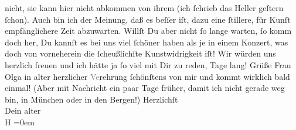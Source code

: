 \begin{ledgroupsized}[t]{13cm}
               nicht, sie kann hier nicht abkommen von ihrem \label{K_L02204_1v}\label{K_L02204_1h} (ich ſchrieb das Heller geſtern ſchon). Auch bin ich der Meinung, daß es beſſer iſt, dazu
               eine ſtillere, für Kunſt empfänglichere Zeit abzuwarten. Willſt Du aber nicht ſo
               lange warten, ſo komm doch her, Du kannſt es bei uns viel ſchöner haben als je in
               einem Konzert, was doch von vorneherein die ſcheußlichſte Kunstwidrigkeit iſt! Wir
               würden uns herzlich freuen und ich hätte ja ſo viel mit Dir zu reden, Tage lang!\pend
           \pstart
           Grüße Frau Olga in alter herzlicher
                  \textcolor{gray}{Ve}rehrung ſchönſtens von mir und kommt wirklich bald einmal!
               (Aber mit Nachricht ein paar Tage früher, damit ich nicht gerade weg bin, in München oder in den Bergen!)\pend
           \pstart
           Herzlichſt{\\[\baselineskip]}Dein alter{\\[\baselineskip]}\spacefill\mbox{H}\pend
           \leftskip=0em{}\endnumbering{}\end{ledgroupsized}  \newcommand{\dateiname}{L02204}\newcommand{\titel}{Hermann Bahr an Arthur Schnitzler, 10. 2. 1915}\newcommand{\editorInnen}{ Kurt Ifkovits,  Martin Anton Müller}
      